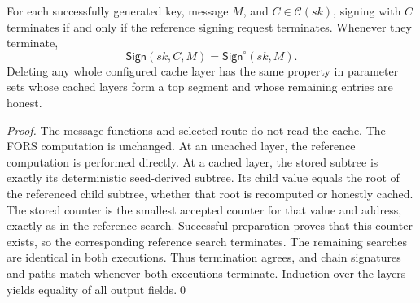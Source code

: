 \documentclass[a4paper,envcountsame,runningheads]{llncs}
\newcommand{\Sign}{\mathsf{Sign}}
\begin{document}
\begin{lemma}\label{lem:transparent}
For each successfully generated key, message $M$, and $C\in\mathcal C(sk)$, signing with $C$ terminates if and only if the reference signing request terminates. Whenever they terminate,
\[
 \Sign(sk,C,M)=\Sign^\circ(sk,M).
\]
Deleting any whole configured cache layer has the same property in parameter sets whose cached layers form a top segment and whose remaining entries are honest.
\end{lemma}
\begin{proof}
The message functions and selected route do not read the cache. The FORS computation is unchanged. At an uncached layer, the reference computation is performed directly. At a cached layer, the stored subtree is exactly its deterministic seed-derived subtree. Its child value equals the root of the referenced child subtree, whether that root is recomputed or honestly cached. The stored counter is the smallest accepted counter for that value and address, exactly as in the reference search. Successful preparation proves that this counter exists, so the corresponding reference search terminates. The remaining searches are identical in both executions. Thus termination agrees, and chain signatures and paths match whenever both executions terminate. Induction over the layers yields equality of all output fields.\qed
\end{proof}
\end{document}
